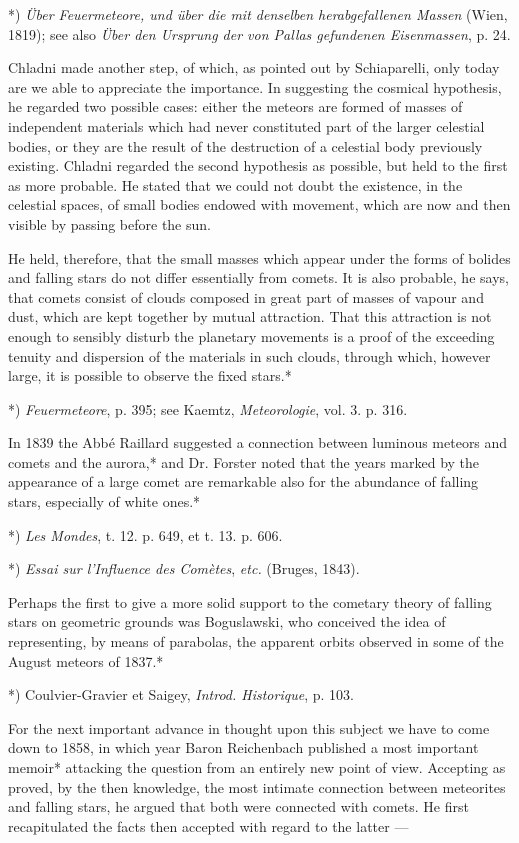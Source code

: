 \documentclass[a4paper, 12pt, oneside, polutonikogreek, english]{article}
\begin{document}
*) \emph{Über Feuermeteore, und über die mit denselben herabgefallenen Massen} (Wien, 1819); see also \emph{Über den Ursprung der von Pallas gefundenen Eisenmassen}, p. 24.

Chladni made another step, of which, as pointed out by Schiaparelli, only today are we able to appreciate the importance. In suggesting the cosmical hypothesis, he regarded two possible cases: either the meteors are formed of masses of independent materials which had never constituted part of the larger celestial bodies, or they are the result of the destruction of a celestial body previously existing. Chladni regarded the second hypothesis as possible, but held to the first as more probable. He stated that we could not doubt the existence, in the celestial spaces, of small bodies endowed with movement, which are now and then visible by passing before the sun.

He held, therefore, that the small masses which appear under the forms of bolides and falling stars do not differ essentially from comets. It is also probable, he says, that comets consist of clouds composed in great part of masses of vapour and dust, which are kept together by mutual attraction. That this attraction is not enough to sensibly disturb the planetary movements is a proof of the exceeding tenuity and dispersion of the materials in such clouds, through which, however large, it is possible to observe the fixed stars.*

*) \emph{Feuermeteore}, p. 395; see Kaemtz, \emph{Meteorologie}, vol. 3. p. 316.

In 1839 the Abbé Raillard suggested a connection between luminous meteors and comets and the aurora,* and Dr. Forster noted that the years marked by the appearance of a large comet are remarkable also for the abundance of falling stars, especially of white ones.*

*) \emph{Les Mondes}, t. 12. p. 649, et t. 13. p. 606.

*) \emph{Essai sur l'Influence des Comètes}, \emph{etc.} (Bruges, 1843).

Perhaps the first to give a more solid support to the cometary theory of falling stars on geometric grounds was Boguslawski, who conceived the idea of representing, by means of parabolas, the apparent orbits observed in some of the August meteors of 1837.*

*) Coulvier-Gravier et Saigey, \emph{Introd. Historique}, p. 103.

For the next important advance in thought upon this subject we have to come down to 1858, in which year Baron Reichenbach published a most important memoir* attacking the question from an entirely new point of view. Accepting as proved, by the then knowledge, the most intimate connection between meteorites and falling stars, he argued that both were connected with comets. He first recapitulated the facts then accepted with regard to the latter ---
\end{document}
